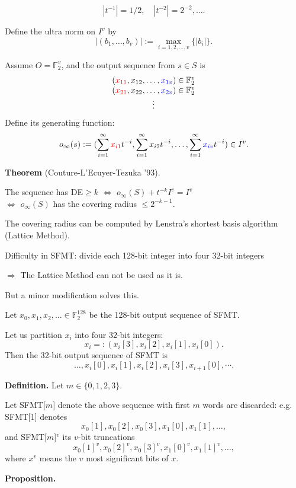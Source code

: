 \documentclass[a4j,12pt,landscape]{jarticle}
\def\F2{{\mathbb F}_2}
\begin{document}
$$|t^{-1}|=1/2, \quad |t^{-2}|=2^{-2}, \ldots.$$

Define the ultra norm on $I^v$ by
$$
|(b_1,\ldots,b_v)|:= \max_{i=1,2,\ldots,v} \{|b_i|\}.
$$

\newpage
Assume 
$O=\F2^v$, and 
the output sequence from $s \in S$
is 
$$
\begin{array}{c}
(\textcolor{red}{x_{11}},x_{12},\ldots,\textcolor{blue}{x_{1v}}) \in \F2^{v}\\
(\textcolor{red}{x_{21}},x_{22},\ldots,\textcolor{blue}{x_{2v}}) \in \F2^{v}\\
\vdots
\end{array}
$$
Define its generating function: 
$$
o_\infty(s):=(\sum_{i=1}^\infty \textcolor{red}{x_{i1}}t^{-i}, 
\sum_{i=1}^\infty x_{i2}t^{-i}, \ldots,
\sum_{i=1}^\infty \textcolor{blue}{x_{iv}}t^{-i}
) \in I^v.
$$

{\bf Theorem} (Couture-L'Ecuyer-Tezuka '93).
\begin{center}
The sequence has DE$\geq k$ 
$\Leftrightarrow$ 
$o_\infty(S) + t^{-k}I^v = I^v$ \\
$\Leftrightarrow$
$o_\infty(S)$ has the covering radius $\leq 2^{-k-1}$.
\end{center}

The covering radius can be computed by 
Lenstra's shortest basis algorithm (Lattice Method).

\newpage
Difficulty in SFMT: divide each 128-bit integer 
into four 32-bit integers 

$\Rightarrow$
The Lattice Method can not be used as it is.

But a minor modification solves this.

\vskip 5mm
Let $x_0, x_1, x_2, \ldots \in \F2^{128}$ be the
128-bit output sequence of SFMT.

Let us partition $x_i$ into four 32-bit integers:
$$
x_i =: (x_i[3], x_i[2], x_i[1], x_i[0]).
$$
Then the 32-bit output sequence of SFMT is
$$
\ldots, x_i[0], x_i[1], x_i[2], x_i[3], x_{i+1}[0], \cdots.
$$

\newpage
{\bf Definition.}
Let $m \in \{0,1,2,3\}$.

Let SFMT[$m$] denote the above
sequence with first $m$ words are discarded:
e.g. SFMT[1] denotes
$$
x_0[1], x_0[2], x_0[3], x_1[0], x_1[1], \ldots,
$$
and SFMT[$m$]$^v$ its $v$-bit truncations
\def\MSB{{\mbox{MSB}}}
$$
x_0[1]^v, x_0[2]^v, x_0[3]^v, x_1[0]^v, x_1[1]^v, \ldots,
$$
where $x^v$ means the $v$ most significant bits of $x$.


\vskip 3mm
{\bf Proposition.}
\end{document}
